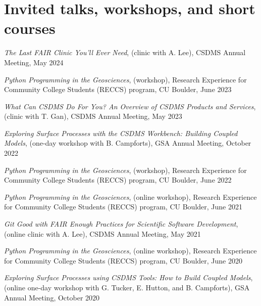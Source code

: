\section{Invited talks, workshops, and short courses}
\vspace{0.5em}

\begin{enumerate}[{[}1{]}]

  \item \textit{The Last FAIR Clinic You'll Ever Need}, (clinic with A.
    Lee), CSDMS Annual Meeting, May 2024

  \item \textit{Python Programming in the Geosciences}, (workshop), Research
    Experience for Community College Students (RECCS) program, CU Boulder, June
    2023

  \item \textit{What Can CSDMS Do For You? An Overview of CSDMS Products and
    Services}, (clinic with T. Gan), CSDMS Annual Meeting, May 2023

  \item \textit{Exploring Surface Processes with the CSDMS Workbench: Building
    Coupled Models}, (one-day workshop with B. Campforts), GSA Annual Meeting,
    October 2022

  \item \textit{Python Programming in the Geosciences}, (workshop), Research
    Experience for Community College Students (RECCS) program, CU Boulder, June
    2022

  \item \textit{Python Programming in the Geosciences}, (online
    workshop), Research Experience for Community College Students
    (RECCS) program, CU Boulder, June 2021

  \item \textit{Git Good with FAIR Enough Practices for Scientific
    Software Development}, (online clinic with A. Lee), CSDMS
    Annual Meeting, May 2021

  \item \textit{Python Programming in the Geosciences}, (online
    workshop), Research Experience for Community College Students
    (RECCS) program, CU Boulder, June 2020

  \item \textit{Exploring Surface Processes using CSDMS Tools: How to Build
    Coupled Models}, (online one-day workshop with G. Tucker, E. Hutton, and B.
    Campforts), GSA Annual Meeting, October 2020


\end{enumerate}
